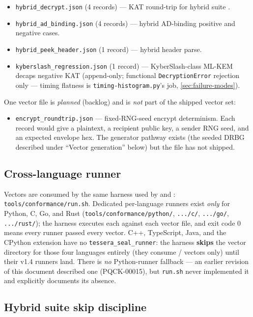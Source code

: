 \begin{itemize}
\item \texttt{hybrid\_decrypt.json} (4 records) --- KAT round-trip for hybrid suite .
\item \texttt{hybrid\_ad\_binding.json} (4 records) --- hybrid AD-binding positive and negative cases.
\item \texttt{hybrid\_peek\_header.json} (1 record) --- hybrid header parse.
\item \texttt{kyberslash\_regression.json} (1 record) --- KyberSlash-class ML-KEM decaps negative KAT (append-only; functional \texttt{DecryptionError} rejection only --- timing flatness is \texttt{timing-histogram.py}'s job, \cref{sec:failure-modes}).
\end{itemize}

One vector file is \emph{planned} (backlog) and is \emph{not} part of the shipped vector set:

\begin{itemize}
\item \texttt{encrypt\_roundtrip.json} --- fixed-RNG-seed encrypt determinism. Each record would give a plaintext, a recipient public key, a sender RNG seed, and an expected envelope hex. The generator pathway exists (the seeded DRBG described under ``Vector generation'' below) but the file has not shipped.
\end{itemize}

\subsection{Cross-language runner}

Vectors are consumed by the same harness used by \pqid{} and \pqhash{}: \texttt{tools/conformance/run.sh}. Dedicated per-language \pqcrypt{} runners exist \emph{only} for Python, C, Go, and Rust (\texttt{tools/conformance/python/}, \texttt{.../c/}, \texttt{.../go/}, \texttt{.../rust/}); the harness executes each against each vector file, and exit code 0 means every runner passed every vector. C++, TypeScript, Java, and the CPython extension have no \texttt{tessera\_seal\_runner}: the harness \textbf{skips} the \pqcrypt{} vector directory for those four languages entirely (they consume \pqid{}/\pqhash{} vectors only) until their v1.4 runners land. There is \emph{no} Python-runner fallback --- an earlier revision of this document described one (PQCK-00015), but \texttt{run.sh} never implemented it and explicitly documents its absence.

\subsection{Hybrid suite  skip discipline}

